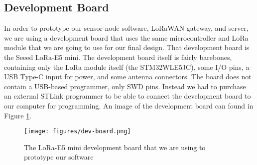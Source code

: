 \subsection{Development Board}
In order to prototype our sensor node software, LoRaWAN gateway, and server, we are using a development board that uses the same microcontroller and LoRa module that we are going to use for our final design. That development board is the Seeed LoRa-E5 mini. The development board itself is fairly barebones, containing only the LoRa module itself (the STM32WLE5JC), some I/O pins, a USB Type-C input for power, and some antenna connectors. The board does not contain a USB-based programmer, only SWD pins. Instead we had to purchase an external STLink programmer to be able to connect the development board to our computer for programming. An image of the development board can found in Figure \ref{fig:dev-board}.

\begin{figure}
    \centering
    \texttt{[image: figures/dev-board.png]}
    \caption{The LoRa-E5 mini development board that we are using to prototype our software}
    \label{fig:dev-board}
\end{figure}